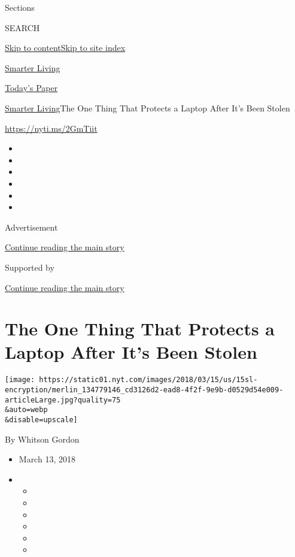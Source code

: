 Sections

SEARCH

\protect\hyperlink{site-content}{Skip to
content}\protect\hyperlink{site-index}{Skip to site index}

\href{https://www.nytimes.com/section/smarter-living}{Smarter Living}

\href{https://myaccount.nytimes.com/auth/login?response_type=cookie\&client_id=vi}{}

\href{https://www.nytimes.com/section/todayspaper}{Today's Paper}

\href{/section/smarter-living}{Smarter Living}\textbar{}The One Thing
That Protects a Laptop After It's Been Stolen

\url{https://nyti.ms/2GmTiit}

\begin{itemize}
\item
\item
\item
\item
\item
\item
\end{itemize}

Advertisement

\protect\hyperlink{after-top}{Continue reading the main story}

Supported by

\protect\hyperlink{after-sponsor}{Continue reading the main story}

\hypertarget{the-one-thing-that-protects-a-laptop-after-its-been-stolen}{%
\section{The One Thing That Protects a Laptop After It's Been
Stolen}\label{the-one-thing-that-protects-a-laptop-after-its-been-stolen}}

\texttt{[image: https://static01.nyt.com/images/2018/03/15/us/15sl-encryption/merlin\_134779146\_cd3126d2-ead8-4f2f-9e9b-d0529d54e009-articleLarge.jpg?quality=75\\\&auto=webp\\\&disable=upscale]}

By Whitson Gordon

\begin{itemize}
\item
  March 13, 2018
\item
  \begin{itemize}
  \item
  \item
  \item
  \item
  \item
  \item
  \end{itemize}
\end{itemize}

